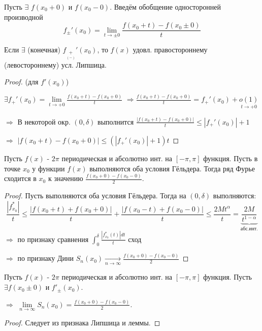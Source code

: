 \documentclass{article}
\theoremstyle{definition}
\numberwithin{theorem}{section}
\numberwithin{lemma}{section}
\numberwithin{definition}{section}
\numberwithin{corollary}{section}
\numberwithin{equation}{section}
\let\implies\Rightarrow
\begin{document}
\begin{definition}
  Пусть $\exists$ $f(x_0+0)$ и $f(x_0-0)$. Введём обобщение односторонней производной
  \[
    f_{\pm}'(x_0)=\lim\limits_{t\to \pm 0} \frac{f(x_0+t)-f(x_0\pm0)}{t}
  \]
\end{definition}
\begin{lemma}
  Если $\exists$ (конечная) $f_{\underset{(-)}{+}}'(x_0)$, то $f(x)$ удовл.
  правостороннему (левостороннему) усл. Липшица.
\end{lemma}
\begin{proof}
  (для $f'(x_0)$)

  $\exists f_{+}'(x_0)=\lim\limits_{t\to+0}\frac{f(x_0+t)-f(x_0+0)}{t}$
  $\implies \frac{f(x_0+t)-f(x_0+0)}{t}=f_{+}'(x_0)+\underset{t\to +0}{o(1)}$

  $\implies$ В некоторой окр. $(0,\delta)$ выполнится
  $\frac{|f(x_0+t)-f(x_0+0)|}{t}\le |f_{+}'(x_{0})|+1$

  $\implies$ $|f(x_{0}+t)-f(x_{0}+0)|\le (|f_{+}'(x_{0})|+1)t$
\end{proof}
\begin{theorem}
  Пусть $f(x)$ - $2\pi$ периодическая и абсолютно инт. на $[-\pi,\pi]$ функция.
  Пусть  в точке $x_0$ у функции $f(x)$ выполняются оба условия Гёльдера.
  Тогда ряд Фурье сходится в $x_{0}$ к значению $\frac{f(x_{0}+0)-f(x_{0}-0)}{2}$.
\end{theorem}
\begin{proof}
  Пусть выполняются оба условия Гёльдера.
  Тогда на $(0,\delta)$ выполняются:
  \[
    \frac{|f^{*}_{x_{0}}|}{t}\le \frac{|f(x_0+t)+f(x_0+0)|}{t}+\frac{|f(x_0-t)+f(x_0-0)|}{t}
    \le \frac{2Mt^{\alpha}}{t}=\underbrace{\frac{2M}{t^{1-\alpha}}}_{\text{абс.инт.}}
  \]
  $\implies$ по признаку сравнения $\int_{0}^{\delta}\frac{|f_{x_{0}}^{*}(t)|dt}{t}$ сход

  $\implies$ по признаку Дини  $S_n(x_{0})\underset{n\to\infty}{\to}\frac{f(x_{0}+0)-f(x_{0}-0)}{2}$
\end{proof}
\begin{corollary}
  Пусть $f(x)$ - $2\pi$ периодическая и абсолютно инт. на $[-\pi,\pi]$ функция.
  Пусть $\exists f(x_{0}\pm 0)$ и $f'_{\pm}(x_{0})$.

  $\implies$ $\lim\limits_{n\to \infty}S_n(x_{0})=\frac{f(x_{0}+0)-f(x_{0}-0)}{2}$.
\end{corollary}
\begin{proof}
  Следует из признака Липшица и леммы.
\end{proof}
\end{document}

